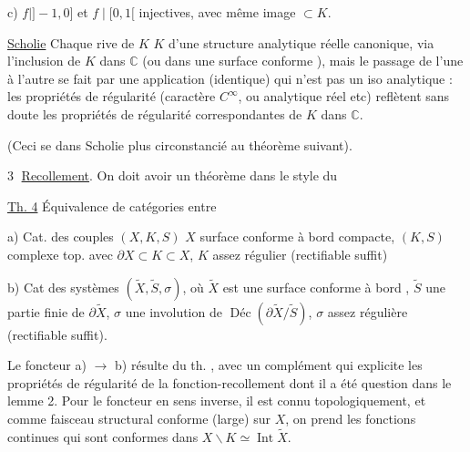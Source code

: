 c) $f\mid ]-1,0]$ et $f\mid[0,1[$ injectives, avec même image $\subset K$.

\uline{Scholie} Chaque rive de $K$   $K$ d'une structure analytique réelle canonique, via l'inclusion de $K$ dans $\mathbb C$ (ou dans une surface conforme ), mais le passage de l'une à l'autre se fait par une application (identique) qui n'est pas un iso analytique : les propriétés de régularité (caractère $C^\infty$, ou analytique réel etc) reflètent sans doute les propriétés de régularité correspondantes de $K$ dans $\mathbb C$.

(Ceci  se  dans   Scholie plus circonstancié au théorème suivant).

\textcircled{3} \uline{Recollement}. On doit avoir un théorème dans le style du


\uline{Th. 4} Équivalence de catégories entre

a) Cat. des couples $(X,K,S)$ $X$ surface conforme à bord compacte, $(K,S)$ complexe top.   avec $\partial X\subset K\subset X$, $K$ assez régulier (rectifiable suffit)


b) Cat des systèmes $(\widetilde X,\widetilde S,\sigma)$, où $\widetilde X$ est une surface conforme à bord , $\widetilde S$ une partie finie de $\partial\widetilde X$, $\sigma$ une involution de $\operatorname{Déc}(\partial\widetilde X/\widetilde S)$, $\sigma$ assez régulière (rectifiable suffit).

Le foncteur a) $\longrightarrow$ b) résulte du th. , avec un complément qui explicite les propriétés de régularité de la fonction-recollement dont il a été question dans le lemme 2. Pour le foncteur en sens inverse, il est connu topologiquement, et comme faisceau structural conforme (large) sur $X$, on prend les fonctions continues qui sont conformes dans $X\smallsetminus K\simeq\operatorname{Int}\widetilde X$.


